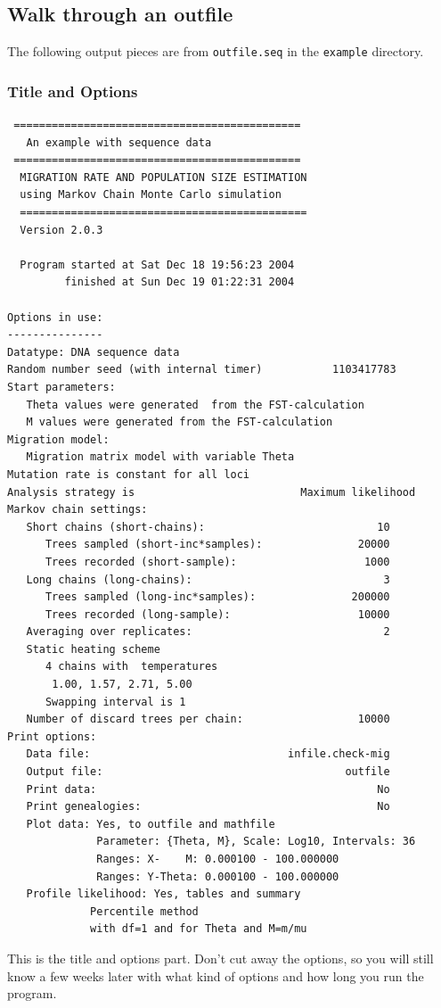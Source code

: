 \subsection{Walk through an outfile}
The following output pieces are from {\tt outfile.seq} in the {\tt example} directory.
\subsubsection{Title and Options}
\begin{center}
\begin{boxedminipage}{6in}
\begin{footnotesize}
\begin{tt}
\begin{verbatim}
 =============================================
   An example with sequence data
 =============================================
  MIGRATION RATE AND POPULATION SIZE ESTIMATION
  using Markov Chain Monte Carlo simulation
  =============================================
  Version 2.0.3

  Program started at Sat Dec 18 19:56:23 2004
         finished at Sun Dec 19 01:22:31 2004
     
Options in use:
---------------
Datatype: DNA sequence data
Random number seed (with internal timer)           1103417783
Start parameters:
   Theta values were generated  from the FST-calculation
   M values were generated from the FST-calculation
Migration model:
   Migration matrix model with variable Theta  
Mutation rate is constant for all loci
Analysis strategy is                          Maximum likelihood
Markov chain settings:
   Short chains (short-chains):                           10
      Trees sampled (short-inc*samples):               20000
      Trees recorded (short-sample):                    1000
   Long chains (long-chains):                              3
      Trees sampled (long-inc*samples):               200000
      Trees recorded (long-sample):                    10000
   Averaging over replicates:                              2
   Static heating scheme
      4 chains with  temperatures
       1.00, 1.57, 2.71, 5.00
      Swapping interval is 1
   Number of discard trees per chain:                  10000
Print options:
   Data file:                               infile.check-mig
   Output file:                                      outfile
   Print data:                                            No
   Print genealogies:                                     No
   Plot data: Yes, to outfile and mathfile                  
              Parameter: {Theta, M}, Scale: Log10, Intervals: 36
              Ranges: X-    M: 0.000100 - 100.000000
              Ranges: Y-Theta: 0.000100 - 100.000000
   Profile likelihood: Yes, tables and summary             
             Percentile method
             with df=1 and for Theta and M=m/mu
\end{verbatim}
\end{tt}
\end{footnotesize}
\end{boxedminipage}
\end{center}
This is the title and options part. Don't cut away the options, so you will 
still
know a few weeks later with what kind of options and how long you
run the program.
\newpage

